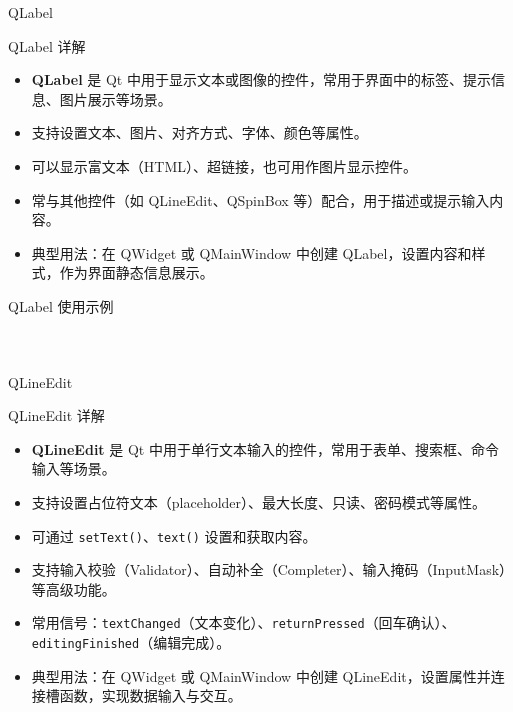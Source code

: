 \documentclass[UTF8,aspectratio=169]{beamer}
\begin{document}
\begin{frame}{QLabel}
    \begin{ytublock}{QLabel 详解}
        \begin{itemize}
            \item \textbf{QLabel} 是 Qt 中用于显示文本或图像的控件，常用于界面中的标签、提示信息、图片展示等场景。
            \item 支持设置文本、图片、对齐方式、字体、颜色等属性。
            \item 可以显示富文本（HTML）、超链接，也可用作图片显示控件。
            \item 常与其他控件（如 QLineEdit、QSpinBox 等）配合，用于描述或提示输入内容。
            \item 典型用法：在 QWidget 或 QMainWindow 中创建 QLabel，设置内容和样式，作为界面静态信息展示。
        \end{itemize}
    \end{ytublock}
\end{frame}

\begin{frame}[fragile]{QLabel 使用示例}
    \begin{columns}
        \begin{column}{0.48\textwidth}
            \inputminted[firstline=1,lastline=15]{cpp}{code/qt_label_example.cpp}
        \end{column}
        \begin{column}{0.48\textwidth}
            \inputminted[firstline=16,lastline=30]{cpp}{code/qt_label_example.cpp}
        \end{column}
    \end{columns}
\end{frame}

\begin{frame}{QLineEdit}
    \begin{ytublock}{QLineEdit 详解}
        \begin{itemize}
            \item \textbf{QLineEdit} 是 Qt 中用于单行文本输入的控件，常用于表单、搜索框、命令输入等场景。
            \item 支持设置占位符文本（placeholder）、最大长度、只读、密码模式等属性。
            \item 可通过 \texttt{setText()}、\texttt{text()} 设置和获取内容。
            \item 支持输入校验（Validator）、自动补全（Completer）、输入掩码（InputMask）等高级功能。
            \item 常用信号：\texttt{textChanged}（文本变化）、\texttt{returnPressed}（回车确认）、\texttt{editingFinished}（编辑完成）。
            \item 典型用法：在 QWidget 或 QMainWindow 中创建 QLineEdit，设置属性并连接槽函数，实现数据输入与交互。
        \end{itemize}
    \end{ytublock}
\end{frame}
\end{document}
